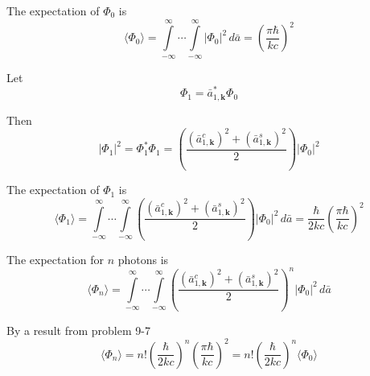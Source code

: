 The expectation of $\Phi_0$ is
\begin{equation*}
\langle\Phi_0\rangle=
\int\limits_{-\infty}^\infty\cdots
\int\limits_{-\infty}^\infty
\vert\Phi_0\vert^2\,d\bar a
=\left(\frac{\pi\hbar}{kc}\right)^2
\tag{1}
\end{equation*}

Let
\begin{equation*}
\Phi_1=\bar a_{1,\mathbf k}^*\Phi_0
\end{equation*}

Then
\begin{equation*}
\vert\Phi_1\vert^2
=\Phi_1^*\Phi_1
=\left(\frac{(\bar a_{1,\mathbf k}^c)^2+(\bar a_{1,\mathbf k}^s)^2}{2}\right)
\vert\Phi_0\vert^2
\end{equation*}

The expectation of $\Phi_1$ is
\begin{equation*}
\langle\Phi_1\rangle=
\int\limits_{-\infty}^\infty\cdots
\int\limits_{-\infty}^\infty
\left(\frac{(\bar a_{1,\mathbf k}^c)^2+(\bar a_{1,\mathbf k}^s)^2}{2}\right)
\vert\Phi_0\vert^2\,d\bar a
=\frac{\hbar}{2kc}
\left(\frac{\pi\hbar}{kc}\right)^2
\tag{2}
\end{equation*}

The expectation for $n$ photons is
\begin{equation*}
\langle\Phi_n\rangle=
\int\limits_{-\infty}^\infty\cdots
\int\limits_{-\infty}^\infty
\left(\frac{(\bar a_{1,\mathbf k}^c)^2+(\bar a_{1,\mathbf k}^s)^2}{2}\right)^n
\vert\Phi_0\vert^2\,d\bar a
\end{equation*}

By a result from problem 9-7
\begin{equation*}
\langle\Phi_n\rangle
=n!\left(\frac{\hbar}{2kc}\right)^n\left(\frac{\pi\hbar}{kc}\right)^2
=n!\left(\frac{\hbar}{2kc}\right)^n\langle\Phi_0\rangle
\tag{3}
\end{equation*}


